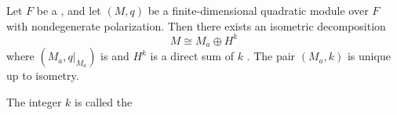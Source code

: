\begin{theorem} \label{theorem:witt_decomposition_theorem_for_quadratic_forms_over_fields}
Let $F$ be a , and let $(M, q)$ be a finite-dimensional quadratic module over $F$ with nondegenerate polarization. Then there exists an isometric decomposition
$$M \cong M_a \oplus H^k$$
where $(M_a, q|_{M_a})$ is  and $H^k$ is a direct sum of $k$ . The pair $(M_a, k)$ is unique up to isometry.

The integer $k$ is called the 
\end{theorem}

